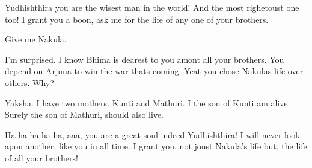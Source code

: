 Yudhishthira you are the wisest man in the world! And the most righetoust one too! I grant you a boon, ask me for the life of any one of your brothers. 

Give me Nakula. 

I'm surprised. I know Bhima is dearest to you amont all your brothers. You depend on Arjuna to win the war thats coming. Yeat you chose Nakulas life over others. Why? 

Yaksha. I have two mothers. Kunti and Mathuri. I the son of Kunti am alive. Surely the son of Mathuri, should also live. 

Ha ha ha ha ha, aaa, you are a great soul indeed Yudhishthira! I will never look apon another, like you in all time. I grant you, not joust Nakula's life but, the life of all your brothers! 

